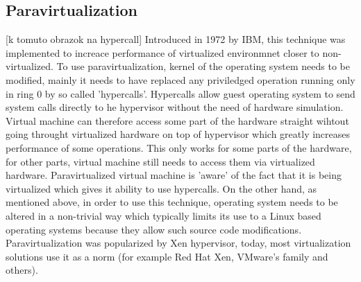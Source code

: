 \begin{enumerate}
\subsection{Paravirtualization}
[k tomuto obrazok na hypercall] Introduced in 1972 by IBM, this technique was implemented to increace performance of virtualized environmnet closer to non-virtualized. To use paravirtualization, kernel of the operating system needs to be modified, mainly it needs to have replaced any priviledged operation running only in ring 0 by so called 'hypercalls'. Hypercalls allow guest operating system to send system calls directly to he hypervisor without the need of hardware simulation. Virtual machine can therefore access some part of the hardware straight wihtout going throught virtualized hardware on top of hypervisor which greatly increases performance of some operations. This only works for some parts of the hardware, for other parts, virtual machine still needs to access them via virtualized hardware. Paravirtualized virtual machine is 'aware' of the fact that it is being virtualized which gives it ability to use hypercalls. On the other hand, as mentioned above, in order to use this technique, operating system needs to be altered in a non-trivial way which typically limits its use to a Linux based operating systems because they allow such source code modifications.
Paravirtualization was popularized by Xen hypervisor, today, most virtualization solutions use it as a norm (for example Red Hat Xen, VMware's family and others).


\end{enumerate}
